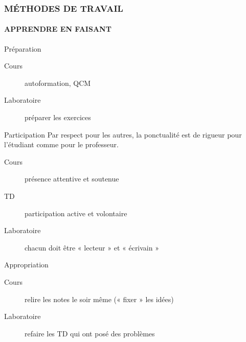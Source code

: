 \begin{frame}
\frametitle{\uppercase{Méthodes de travail}}
\framesubtitle{\uppercase{Apprendre en faisant}}
\begin{block}{Préparation}
\begin{description}
\item[Cours] autoformation, QCM
\item[Laboratoire] préparer les exercices
\end{description}
\end{block}

\begin{block}{Participation}
Par respect pour les autres, la \alert{ponctualité} est de rigueur pour l'étudiant 
comme pour le professeur.
\begin{description}
\item[Cours] présence attentive et soutenue
\item[TD] participation active et volontaire
\item[Laboratoire] chacun doit être « lecteur » et « écrivain »
\end{description}
\end{block}

\begin{block}{Appropriation}
\begin{description}
\item[Cours] relire les notes le soir même (« fixer » les idées)
\item[Laboratoire] refaire les TD qui ont posé des problèmes
\end{description}
\end{block}

\end{frame}
